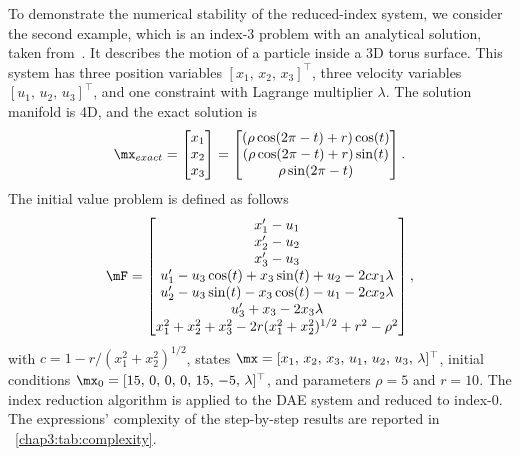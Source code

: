 To demonstrate the numerical stability of the reduced-index system, we consider the second example, which is an index-3 problem with an analytical solution, taken from~\cite{campbell1995constraint}. It describes the motion of a particle inside a 3D torus surface. This system has three position variables $[x_{1}, \, x_{2}, \, x_{3}]^\top$, three velocity variables $[u_{1}, \, u_{2}, \, u_{3}]^\top$, and one constraint with Lagrange multiplier $\lambda$. The solution manifold is 4D, and the exact solution is
%
\begin{equation}
  \label{chap3:eq:torus_solution}
  \mx_{exact} = \begin{bmatrix}
    x_{1} \\ x_{2} \\ x_{3}
  \end{bmatrix} = \begin{bmatrix}
    (\rho \cos(2\pi - t) + r) \cos(t) \\
    (\rho \cos(2\pi - t) + r) \sin(t) \\
    \rho \sin(2\pi - t)
  \end{bmatrix}.
\end{equation}
%
The initial value problem is defined as follows
%
\begin{equation}
  \label{chap3:eq:torus}
  \mF = \begin{bmatrix}
    x^{\prime}_{1} - u_{1} \\
    x^{\prime}_{2} - u_{2} \\
    x^{\prime}_{3} - u_{3} \\
    u^{\prime}_{1} - u_{3}\cos(t) + x_{3}\sin(t) + u_{2} - 2 c x_{1}\lambda \\
    u^{\prime}_{2} - u_{3}\sin(t) - x_{3}\cos(t) - u_{1} - 2 c x_{2}\lambda \\
    u^{\prime}_{3} + x_{3} - 2x_{3}\lambda \\
    x_{1}^2 + x_{2}^2 + x_{3}^2 - 2r(x_{1}^2 + x_{2}^2)^{1/2} + r^2 - \rho^2
  \end{bmatrix},
\end{equation}
%
with $c = 1 - {r} / {(x_{1}^2 + x_{2}^2)^{1/2}}$, states $\mx = [x_{1}, \, x_{2}, \, x_{3}, \, u_{1}, \, u_{2}, \, u_{3}, \, \lambda]^{\top}$, initial conditions $\mx_{0} = [15, \, 0, \, 0, \, 0, \, 15, \, -5, \, \lambda]^{\top}$, and parameters $\rho = 5$ and $r = 10$. The index reduction algorithm is applied to the \ac{DAE} system and reduced to index-0. The expressions' complexity of the step-by-step results are reported in \tablename{}~\ref{chap3:tab:complexity}.

